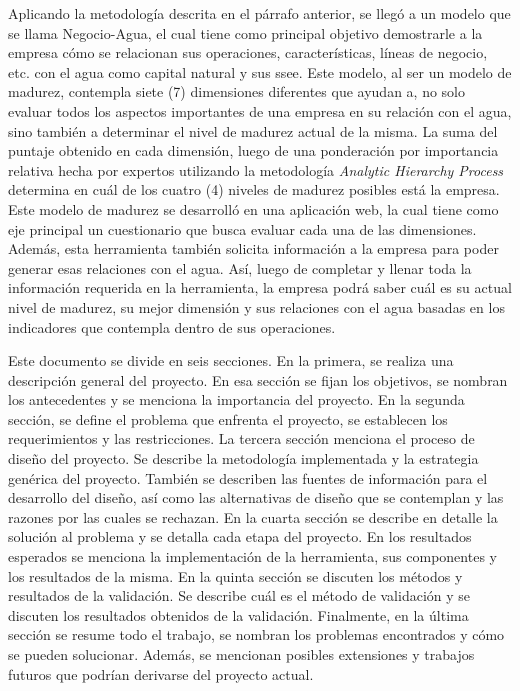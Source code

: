 \hfill

Aplicando la metodología descrita en el párrafo anterior, se llegó a un modelo que se llama Negocio-Agua, el cual tiene como principal objetivo demostrarle a la empresa cómo se relacionan sus operaciones, características, líneas de negocio, etc. con el agua como capital natural y sus \acrshort{ssee}. Este modelo, al ser un modelo de madurez, contempla siete (7) dimensiones diferentes que ayudan a, no solo evaluar todos los aspectos importantes de una empresa en su relación con el agua, sino también a determinar el nivel de madurez actual de la misma. La suma del puntaje obtenido en cada dimensión, luego de una ponderación por importancia relativa hecha por expertos utilizando la metodología \textit{Analytic Hierarchy Process} \parencite{bahurmoz-2006} determina en cuál de los cuatro (4) niveles de madurez posibles está la empresa. Este modelo de madurez se desarrolló en una aplicación web, la cual tiene como eje principal un cuestionario que busca evaluar cada una de las dimensiones. Además, esta herramienta también solicita información a la empresa para poder generar esas relaciones con el agua. Así, luego de completar y llenar toda la información requerida en la herramienta, la empresa podrá saber cuál es su actual nivel de madurez, su mejor dimensión y sus relaciones con el agua basadas en los indicadores que contempla dentro de sus operaciones. 

\hfill

Este documento se divide en seis secciones. En la primera, se realiza una descripción general del proyecto. En esa sección se fijan los objetivos, se nombran los antecedentes y se menciona la importancia del proyecto. En la segunda sección, se define el problema que enfrenta el proyecto, se establecen los requerimientos y las restricciones. La tercera sección menciona el proceso de diseño del proyecto. Se describe la metodología implementada y la estrategia genérica del proyecto. También se describen las fuentes de información para el desarrollo del diseño, así como las alternativas de diseño que se contemplan y las razones por las cuales se rechazan. En la cuarta sección se describe en detalle la solución al problema y se detalla cada etapa del proyecto. En los resultados esperados se menciona la implementación de la herramienta, sus componentes y los resultados de la misma. En la quinta sección se discuten los métodos y resultados de la validación. Se describe cuál es el método de validación y se discuten los resultados obtenidos de la validación. Finalmente, en la última sección se resume todo el trabajo, se nombran los problemas encontrados y cómo se pueden solucionar. Además, se mencionan posibles extensiones y trabajos futuros que podrían derivarse del proyecto actual.